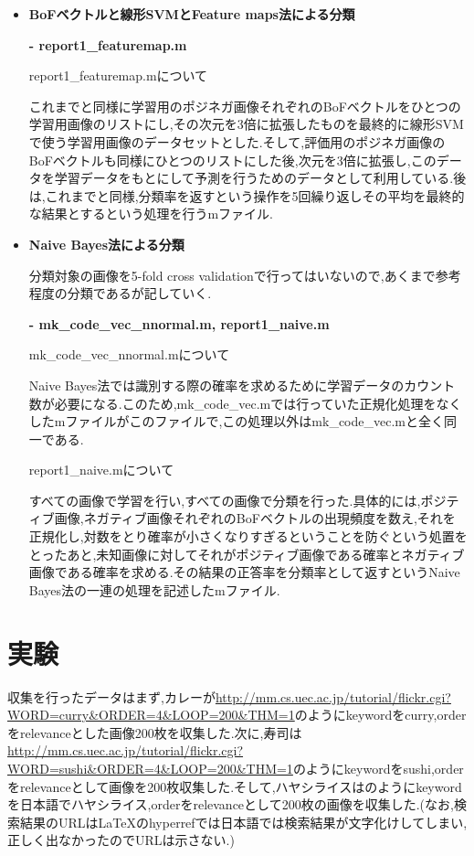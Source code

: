 \documentclass[11pt,a4j]{jreport}
\begin{document}
\begin{itemize}
\item \textbf{BoFベクトルと線形SVMとFeature maps法による分類}

      \hspace{0.5cm} \textbf{- report1\_featuremap.m}

      report1\_featuremap.mについて

      これまでと同様に学習用のポジネガ画像それぞれのBoFベクトルをひとつの学習用画像のリストにし,その次元を3倍に拡張したものを最終的に線形SVMで使う学習用画像のデータセットとした.そして,評価用のポジネガ画像のBoFベクトルも同様にひとつのリストにした後,次元を3倍に拡張し,このデータを学習データをもとにして予測を行うためのデータとして利用している.後は,これまでと同様,分類率を返すという操作を5回繰り返しその平均を最終的な結果とするという処理を行うmファイル.

\item \textbf{Naive Bayes法による分類}

  分類対象の画像を5-fold cross validationで行ってはいないので,あくまで参考程度の分類であるが記していく.

  \hspace{0.5cm} \textbf{- mk\_code\_vec\_nnormal.m, report1\_naive.m}

  mk\_code\_vec\_nnormal.mについて

  Naive Bayes法では識別する際の確率を求めるために学習データのカウント数が必要になる.このため,mk\_code\_vec.mでは行っていた正規化処理をなくしたmファイルがこのファイルで,この処理以外はmk\_code\_vec.mと全く同一である.
  
  report1\_naive.mについて

  すべての画像で学習を行い,すべての画像で分類を行った.具体的には,ポジティブ画像,ネガティブ画像それぞれのBoFベクトルの出現頻度を数え,それを正規化し,対数をとり確率が小さくなりすぎるということを防ぐという処置をとったあと,未知画像に対してそれがポジティブ画像である確率とネガティブ画像である確率を求める.その結果の正答率を分類率として返すというNaive Bayes法の一連の処理を記述したmファイル.
\end{itemize}


\section{実験}
収集を行ったデータはまず,カレーが\url{http://mm.cs.uec.ac.jp/tutorial/flickr.cgi?WORD=curry&ORDER=4&LOOP=200&THM=1}のようにkeywordをcurry,orderをrelevanceとした画像200枚を収集した.次に,寿司は\url{http://mm.cs.uec.ac.jp/tutorial/flickr.cgi?WORD=sushi&ORDER=4&LOOP=200&THM=1}のようにkeywordをsushi,orderをrelevanceとして画像を200枚収集した.そして,ハヤシライスはのようにkeywordを日本語でハヤシライス,orderをrelevanceとして200枚の画像を収集した.(なお,検索結果のURLは\LaTeX のhyperrefでは日本語では検索結果が文字化けしてしまい,正しく出なかったのでURLは示さない.)
\end{document}
